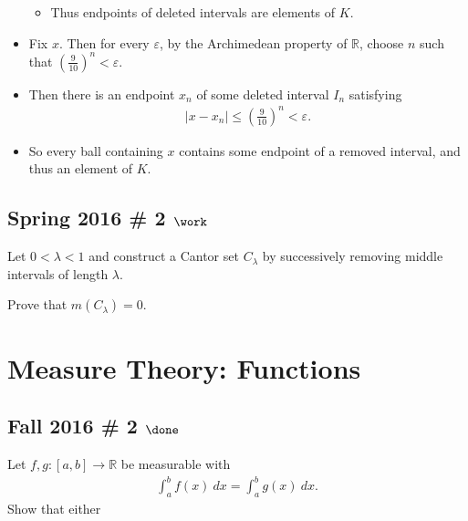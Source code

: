 \begin{solution}
\begin{itemize}
  \begin{itemize}
  \tightlist
  \item
    Thus endpoints of deleted intervals are elements of \(K\).
  \end{itemize}
\item
  Fix \(x\). Then for every \(\varepsilon\), by the Archimedean property
  of \({\mathbb{R}}\), choose \(n\) such that
  \(\left( \frac 9 {10} \right)^n < \varepsilon\).
\item
  Then there is an endpoint \(x_n\) of some deleted interval \(I_n\)
  satisfying
  \begin{align*}{\left\lvert {x - x_n} \right\rvert} \leq  \left( \frac 9 {10} \right)^n < {\varepsilon}.\end{align*}
\item
  So every ball containing \(x\) contains some endpoint of a removed
  interval, and thus an element of \(K\).
\end{itemize}

\end{solution}

\hypertarget{spring-2016-2-work}{%
\subsection{\texorpdfstring{Spring 2016 \# 2
\(\work\)}{Spring 2016 \# 2 \textbackslash work}}\label{spring-2016-2-work}}

Let \(0 < \lambda < 1\) and construct a Cantor set \(C_\lambda\) by
successively removing middle intervals of length \(\lambda\).

Prove that \(m(C_\lambda) = 0\).

\hypertarget{measure-theory-functions}{%
\section{Measure Theory: Functions}\label{measure-theory-functions}}

\hypertarget{fall-2016-2-done}{%
\subsection{\texorpdfstring{Fall 2016 \# 2
\(\done\)}{Fall 2016 \# 2 \textbackslash done}}\label{fall-2016-2-done}}

Let \(f, g: [a, b] \to {\mathbb{R}}\) be measurable with
\begin{align*}
\int_{a}^{b} f(x) ~d x=\int_{a}^{b} g(x) ~d x.
\end{align*}
Show that either


